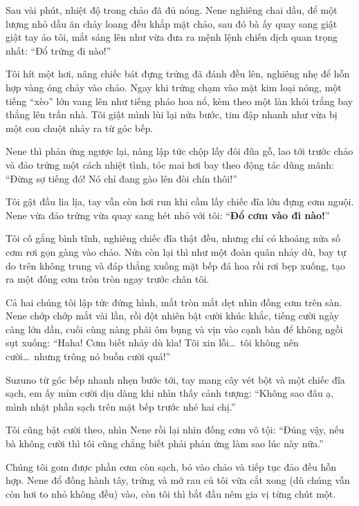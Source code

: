 \documentclass[../main.tex]{subfiles}
\begin{document}
\ct

Sau vài phút, nhiệt độ trong chảo đã đủ nóng. Nene nghiêng chai dầu, để một lượng nhỏ dầu ăn chảy loang đều khắp mặt chảo, sau đó bà ấy quay sang giật giật tay áo tôi, mắt sáng lên như vừa đưa ra mệnh lệnh chiến dịch quan trọng nhất: ``Đổ trứng đi nào!''

Tôi hít một hơi, nâng chiếc bát đựng trứng đã đánh đều lên, nghiêng nhẹ để hỗn hợp vàng óng chảy vào chảo. Ngay khi trứng chạm vào mặt kim loại nóng, một tiếng ``xèo'' lớn vang lên như tiếng pháo hoa nổ, kèm theo một làn khói trắng bay thẳng lên trần nhà. Tôi giật mình lùi lại nửa bước, tim đập nhanh như vừa bị một con chuột nhảy ra từ góc bếp.

Nene thì phản ứng ngược lại, nàng lập tức chộp lấy đôi đũa gỗ, lao tới trước chảo và đảo trứng một cách nhiệt tình, tóc mai hơi bay theo động tác dũng mãnh: ``Đừng sợ tiếng đó! Nó chỉ đang gào lên đòi chín thôi!''

Tôi gật đầu lia lịa, tay vẫn còn hơi run khi cầm lấy chiếc đĩa lớn đựng cơm nguội. Nene vừa đảo trứng vừa quay sang hét nhỏ với tôi: ``\textbf{Đổ cơm vào đi nào!}''

Tôi cố gắng bình tĩnh, nghiêng chiếc đĩa thật đều, nhưng chỉ có khoảng nửa số cơm rơi gọn gàng vào chảo. Nửa còn lại thì như một đoàn quân nhảy dù, bay tự do trên không trung và đáp thẳng xuống mặt bếp đá hoa rồi rơi bẹp xuống, tạo ra một đống cơm tròn tròn ngay trước chân tôi.

Cả hai chúng tôi lập tức đứng hình, mắt tròn mắt dẹt nhìn đống cơm trên sàn. Nene chớp chớp mắt vài lần, rồi đột nhiên bật cười khúc khắc, tiếng cười ngày càng lớn dần, cuối cùng nàng phải ôm bụng và vịn vào cạnh bàn để không ngồi sụt xuống: ``Haha! Cơm biết nhảy dù kìa! Tôi xin lỗi\dots\ tôi không nên cười\dots\ nhưng trông nó buồn cười quá!''

Suzuno từ góc bếp nhanh nhẹn bước tới, tay mang cây vét bột và một chiếc đĩa sạch, em ấy mỉm cười dịu dàng khi nhìn thấy cảnh tượng: ``Không sao đâu ạ, mình nhặt phần sạch trên mặt bếp trước nhé hai chị.''

Tôi cũng bật cười theo, nhìn Nene rồi lại nhìn đống cơm vô tội: ``Đúng vậy, nếu bà không cười thì tôi cũng chẳng biết phải phản ứng làm sao lúc này nữa.''

Chúng tôi gom được phần cơm còn sạch, bỏ vào chảo và tiếp tục đảo đều hỗn hợp. Nene đổ đống hành tây, trứng và mớ rau củ tôi vừa cắt xong (dù chúng vẫn còn hơi to nhỏ không đều) vào, còn tôi thì bắt đầu nêm gia vị từng chút một.
\end{document}
